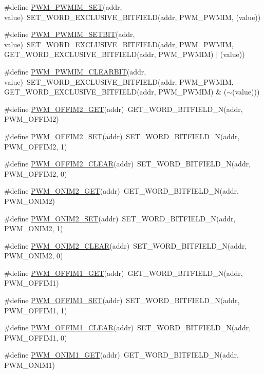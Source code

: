 \begin{DoxyCompactItemize}
\item 
\#define \hyperlink{a00564_a0cfa0f4b4c29d8e3a8f971cb70ea994d}{PWM\_\-PWMIM\_\-SET}(addr, value)~SET\_\-WORD\_\-EXCLUSIVE\_\-BITFIELD(addr, PWM\_\-PWMIM, (value))
\item 
\#define \hyperlink{a00564_a732394f55fb9335162b2b73a45529da7}{PWM\_\-PWMIM\_\-SETBIT}(addr, value)~SET\_\-WORD\_\-EXCLUSIVE\_\-BITFIELD(addr, PWM\_\-PWMIM, GET\_\-WORD\_\-EXCLUSIVE\_\-BITFIELD(addr, PWM\_\-PWMIM) $|$ (value))
\item 
\#define \hyperlink{a00564_a18c5fb63a322174cf0f0244ce3580221}{PWM\_\-PWMIM\_\-CLEARBIT}(addr, value)~SET\_\-WORD\_\-EXCLUSIVE\_\-BITFIELD(addr, PWM\_\-PWMIM, GET\_\-WORD\_\-EXCLUSIVE\_\-BITFIELD(addr, PWM\_\-PWMIM) \& ($\sim$(value)))
\item 
\#define \hyperlink{a00564_a076f66341d1dfb8f5b759a26f6bf06dc}{PWM\_\-OFFIM2\_\-GET}(addr)~GET\_\-WORD\_\-BITFIELD\_\-N(addr, PWM\_\-OFFIM2)
\item 
\#define \hyperlink{a00564_a4b9f89e43199d1c1408372c24c181710}{PWM\_\-OFFIM2\_\-SET}(addr)~SET\_\-WORD\_\-BITFIELD\_\-N(addr, PWM\_\-OFFIM2, 1)
\item 
\#define \hyperlink{a00564_a40e554d32814688a04f796488221abf5}{PWM\_\-OFFIM2\_\-CLEAR}(addr)~SET\_\-WORD\_\-BITFIELD\_\-N(addr, PWM\_\-OFFIM2, 0)
\item 
\#define \hyperlink{a00564_af8dd4c9c3b9b0be6f12a9b5ceed329bc}{PWM\_\-ONIM2\_\-GET}(addr)~GET\_\-WORD\_\-BITFIELD\_\-N(addr, PWM\_\-ONIM2)
\item 
\#define \hyperlink{a00564_a629d987b32c7a9f1d8cb8a6070246a50}{PWM\_\-ONIM2\_\-SET}(addr)~SET\_\-WORD\_\-BITFIELD\_\-N(addr, PWM\_\-ONIM2, 1)
\item 
\#define \hyperlink{a00564_a6ed931eb5a575f34b8875e3584a232cf}{PWM\_\-ONIM2\_\-CLEAR}(addr)~SET\_\-WORD\_\-BITFIELD\_\-N(addr, PWM\_\-ONIM2, 0)
\item 
\#define \hyperlink{a00564_a60ba6888b590e1809d4ed46f9ee1608f}{PWM\_\-OFFIM1\_\-GET}(addr)~GET\_\-WORD\_\-BITFIELD\_\-N(addr, PWM\_\-OFFIM1)
\item 
\#define \hyperlink{a00564_a5e3e0229b2d437e034807dc1bb993dec}{PWM\_\-OFFIM1\_\-SET}(addr)~SET\_\-WORD\_\-BITFIELD\_\-N(addr, PWM\_\-OFFIM1, 1)
\item 
\#define \hyperlink{a00564_a888b1599a7ce5f9ff7fcfe8dd9a97f5b}{PWM\_\-OFFIM1\_\-CLEAR}(addr)~SET\_\-WORD\_\-BITFIELD\_\-N(addr, PWM\_\-OFFIM1, 0)
\item 
\#define \hyperlink{a00564_ac533abc358718d1bbf58c4afc18450d0}{PWM\_\-ONIM1\_\-GET}(addr)~GET\_\-WORD\_\-BITFIELD\_\-N(addr, PWM\_\-ONIM1)

\end{DoxyCompactItemize}
